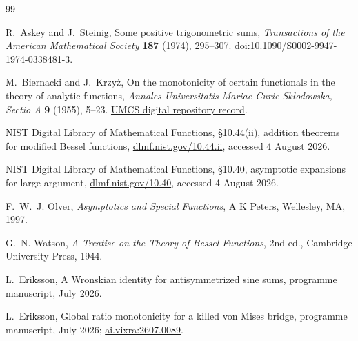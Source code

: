 \documentclass[11pt]{article}
\theoremstyle{definition}
\theoremstyle{remark}
\begin{document}
\begin{thebibliography}{99}
\small
\setlength{\itemsep}{2pt plus 0.2pt}

R.~Askey and J.~Steinig,
Some positive trigonometric sums,
\emph{Transactions of the American Mathematical Society} \textbf{187}
(1974), 295--307.
\href{https://doi.org/10.1090/S0002-9947-1974-0338481-3}
{doi:10.1090/S0002-9947-1974-0338481-3}.

M.~Biernacki and J.~Krzy\.z,
On the monotonicity of certain functionals in the theory of analytic
functions,
\emph{Annales Universitatis Mariae Curie-Sk\l odowska, Sectio A}
\textbf{9} (1955), 5--23.
\href{https://bc.umcs.pl/dlibra/publication/33796/edition/30632}
{UMCS digital repository record}.

NIST Digital Library of Mathematical Functions,
\S10.44(ii), addition theorems for modified Bessel functions,
\href{https://dlmf.nist.gov/10.44.ii}{dlmf.nist.gov/10.44.ii},
accessed 4 August 2026.

NIST Digital Library of Mathematical Functions,
\S10.40, asymptotic expansions for large argument,
\href{https://dlmf.nist.gov/10.40}{dlmf.nist.gov/10.40},
accessed 4 August 2026.

F.~W.~J. Olver,
\emph{Asymptotics and Special Functions},
A K Peters, Wellesley, MA, 1997.

G.~N. Watson,
\emph{A Treatise on the Theory of Bessel Functions}, 2nd ed.,
Cambridge University Press, 1944.

L.~Eriksson,
A Wronskian identity for antisymmetrized sine sums,
programme manuscript, July 2026.

L.~Eriksson,
Global ratio monotonicity for a killed von Mises bridge,
programme manuscript, July 2026;
\href{https://ai.vixra.org/abs/2607.0089}{ai.vixra:2607.0089}.

\end{thebibliography}
\end{document}
